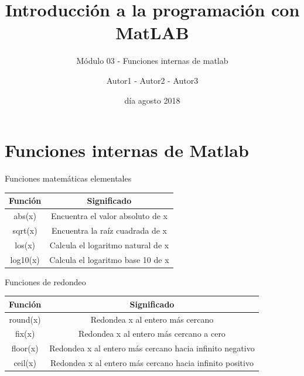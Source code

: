 \documentclass{bredelebeamer}
\title[Programación en MatLAB]{Introducción a la programación con MatLAB}
\subtitle{Módulo 03 - Funciones internas de matlab}
\author{Autor1 - Autor2 - Autor3\inst{1}}
\institute[UTN.BA]
{
  \inst{1}%
  Universidad Tecnológica Nacional\\
  Facultad Regional Buenos Aires
  }
\date{día agosto 2018}
\begin{document}
\begin{frame}
  \titlepage 
\end{frame}




\section{Funciones internas de Matlab}

\begin{frame}{Funciones matemáticas elementales}
\begin{table}[]
\centering
\begin{tabular}{|c|c|}
\hline
Función  & Significado                       \\ \hline
abs(x)   & Encuentra el valor absoluto de x  \\ \hline
sqrt(x)  & Encuentra la raíz cuadrada de x   \\ \hline
los(x)   & Calcula el logaritmo natural de x \\ \hline
log10(x) & Calcula el logaritmo base 10 de x \\ \hline
\end{tabular}
\end{table}
\end{frame}

\begin{frame}{Funciones de redondeo}
\begin{table}[]
\centering
\begin{tabular}{|c|c|}
\hline
Función  & Significado                                              \\ \hline
round(x) & Redondea x al entero más cercano                         \\ \hline
fix(x)   & Redondea x al entero más cercano a cero                  \\ \hline
floor(x) & Redondea x al entero más cercano hacia infinito negativo \\ \hline
ceil(x)  & Redondea x al entero más cercano hacia infinito positivo \\ \hline
\end{tabular}
\end{table}
\end{frame}
\end{document}
